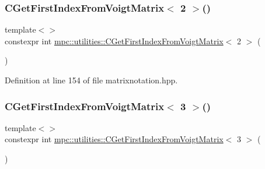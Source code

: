 \mbox{\label{namespacempc_1_1utilities_a9c173e2ecba984e738a4a21047fc78f7}} 
\subsubsection{\texorpdfstring{C\+Get\+First\+Index\+From\+Voigt\+Matrix$<$ 2 $>$()}{CGetFirstIndexFromVoigtMatrix< 2 >()}}
{\footnotesize\ttfamily template$<$$>$ \\
constexpr int \mbox{\hyperlink{namespacempc_1_1utilities_acb1091d4fd58c0821eeeba68a43146ac}{mpc\+::utilities\+::\+C\+Get\+First\+Index\+From\+Voigt\+Matrix}}$<$ 2 $>$ (\begin{DoxyParamCaption}{ }\end{DoxyParamCaption})\hspace{0.3cm}{\ttfamily [inline]}}



Definition at line 154 of file matrixnotation.\+hpp.

\mbox{\label{namespacempc_1_1utilities_a80545c6ddda43d5f72754d0f18ec42fc}} 
\subsubsection{\texorpdfstring{C\+Get\+First\+Index\+From\+Voigt\+Matrix$<$ 3 $>$()}{CGetFirstIndexFromVoigtMatrix< 3 >()}}
{\footnotesize\ttfamily template$<$$>$ \\
constexpr int \mbox{\hyperlink{namespacempc_1_1utilities_acb1091d4fd58c0821eeeba68a43146ac}{mpc\+::utilities\+::\+C\+Get\+First\+Index\+From\+Voigt\+Matrix}}$<$ 3 $>$ (\begin{DoxyParamCaption}{ }\end{DoxyParamCaption})\hspace{0.3cm}{\ttfamily [inline]}}



